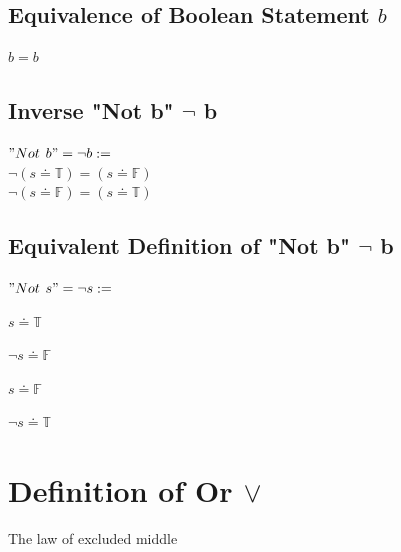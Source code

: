 \documentclass[11pt]{article}
\begin{document}
\subsection{Equivalence of Boolean Statement $b$}
\vspace{1mm}
\begin{center}
$
b = b
$
\end{center}




\subsection{Inverse "Not b" $\lnot$ b}
\begin{center}
$
"Not$ $b" = \lnot b :=
$
\\ \vspace{4mm}
$
\lnot (s \doteq \mathbb{T}) = (s \doteq \mathbb{F})
$
\\ \vspace{4mm}
$
\lnot (s \doteq \mathbb{F}) = (s \doteq \mathbb{T})
$
\end{center}
\subsection{Equivalent Definition of  "Not b" $\lnot$ b}
\vspace{2mm}
\begin{center}
$
"Not$ $s" = \lnot s :=
$
\end{center}
$s \doteq \mathbb{T}$
\begin{center}
$
\lnot s \doteq \mathbb{F}
$
\end{center}
\vspace{2mm}
$s \doteq \mathbb{F}$
\begin{center}
$
\lnot s \doteq \mathbb{T}
$
\end{center}




















\section{Definition of Or $\lor$}
The law of excluded middle
\begin{center}
\end{center}
\end{document}
